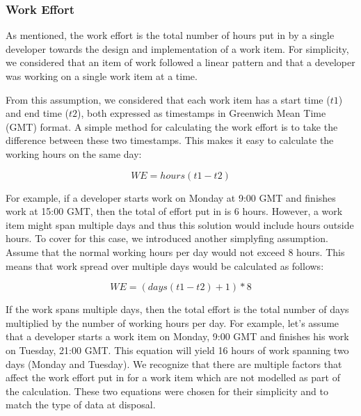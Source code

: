 \documentclass{mpaper}
\begin{document}
\subsubsection*{Work Effort}
\label{work-effort}

As mentioned, the work effort is the total number of hours put in by a single
developer towards the design and implementation of a work item. For simplicity,
we considered that an item of work followed a linear pattern and that a
developer was working on a single work item at a time.

From this assumption, we considered that each work item has a start time ($t1$)
and end time ($t2$), both expressed as timestamps in Greenwich Mean Time (GMT)
format. A simple method for calculating the work effort is to take the
difference between these two timestamps. This makes it easy to calculate the
working hours on the same day:

\begin{equation}
  \label{eq-work-effort-simple}
  WE = hours(t1 - t2)
\end{equation}

For example, if a developer starts work on Monday at 9:00 GMT and finishes work
at 15:00 GMT, then the total of effort put in is 6 hours. However, a work item
might span multiple days and thus this solution would include hours outside
hours. To cover for this case, we introduced another simplyfing assumption.
Assume that the normal working hours per day would not exceed 8 hours. This
means that work spread over multiple days would be calculated as follows:

\begin{equation}
  \label{eq-work-effort-days}
  WE = (days(t1 - t2) + 1) * 8
\end{equation}

If the work spans multiple days, then the total effort is the total number of
days multiplied by the number of working hours per day. For example, let's
assume that a developer starts a work item on Monday, 9:00 GMT and finishes his
work on Tuesday, 21:00 GMT. This equation will yield 16 hours of work spanning
two days (Monday and Tuesday). We recognize that there are multiple factors that
affect the work effort put in for a work item which are not modelled as part of
the calculation. These two equations were chosen for their simplicity and to
match the type of data at disposal. 
\end{document}
